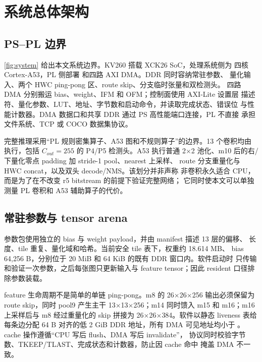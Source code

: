 \section{系统总体架构}
\label{sec:system}

\subsection{PS--PL 边界}

\cref{fig:system} 给出本文系统边界。KV260 搭载 XCK26 SoC，处理系统侧为
四核 Cortex-A53，PL 侧部署 \LASA 和四路 AXI DMA。DDR 同时容纳常驻参数、
量化输入、两个 HWC ping-pong 区、route skip、分支临时张量和双检测头。
四路 DMA 分别搬运 bias、weight、IFM 和 OFM；控制面使用 AXI-Lite 设置层
描述符、量化参数、LUT、地址、字节数和启动命令，并读取完成状态、错误位
与性能计数器。DMA 数据口和共享 DDR 通过 PS 高性能端口连接，PL 不直接
承担文件系统、TCP 或 COCO 数据集协议。



完整推理采用“PL 规则密集算子、A53 图和不规则算子”的边界。13 个卷积均由
\LASA 执行，包括 $C_{out}=255$ 的 P4/P5 检测头。A53 执行普通 2$\times$2
池化、m10 后的右/下量化零点 padding 加 stride-1 pool、nearest 上采样、
route 分支重量化与 HWC concat，以及双头 decode/NMS。该划分并非声称
非卷积永久适合 CPU，而是为了在不改变 r5 bitstream 的前提下验证完整网络；
它同时使本文可以单独测量 PL 卷积和 A53 辅助算子的代价。

\subsection{常驻参数与 tensor arena}

参数包使用独立的 bias 与 weight payload，并由 manifest 描述 13 层的偏移、
长度、tile 重复、量化域和哈希。当前安全 tile 表下，权重约 18.614 MB、
bias 64,256 B，分别位于 20 MiB 和 64 KiB 的既有 DDR 窗口内。软件启动时
只传输和验证一次参数，之后每张图只更新输入与 feature tensor；因此
resident 口径排除参数装载。

feature 生命周期不是简单的单链 ping-pong。m8 的
26$\times$26$\times$256 输出必须保留为 route skip，同时 pool9 产生主干
13$\times$13$\times$256；m14 同时馈入 m15 和 m16；m16 上采样后与 m8
经过重量化的 skip 拼接为 26$\times$26$\times$384。软件以静态 liveness
表给每条边分配 64 B 对齐的低 2 GiB DDR 地址，所有 DMA 可见地址均小于
。cache 操作遵循“CPU 写后 flush、DMA 写后 invalidate”，
协议同时校验字节数、TKEEP/TLAST、完成状态和计数器，防止因 cache 命中
掩盖 DMA 不一致。

